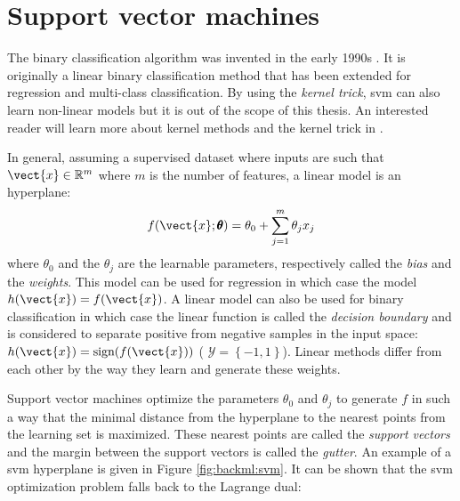 
\section{Support vector machines}
\label{sec:backml:svm}

The  binary classification algorithm was invented in the early 1990s \cite{boser1992training}.
It is originally a linear binary classification method that has been extended for regression and multi-class classification.
By using the \textit{kernel trick}, \acrshort{svm} can also learn non-linear models
but it is out of the scope of this thesis. An interested reader will learn more
about kernel methods and the kernel trick in \cite{hastie2017elements}.

In general, assuming a supervised dataset where inputs are such that
$\vect{x} \in \mathbb{R}^m$ where $m$ is the number of features, a linear model
is an hyperplane:
\begin{equation}
\label{eqn:backml:linearmodel}
f(\vect{x};\pmb{\theta}) = \theta_0 + \sum_{j=1}^m \theta_j x_j
\end{equation}
where $\theta_0$ and the $\theta_j$ are the learnable parameters, respectively
called the \textit{bias} and the \textit{weights}. This model can be used for
regression in which case the model $h(\vect{x}) = f(\vect{x})$. A linear model
can also be used for binary classification in which case the linear function is
called the \textit{decision boundary} and is considered to separate positive from
negative samples in the input space: $h(\vect{x}) = \text{sign}(f(\vect{x}))$ (\ie
$\mathcal{Y} = \left\{-1, 1\right\}$). Linear methods differ from each other by
the way they learn and generate these weights.

Support vector machines optimize the parameters $\theta_0$ and $\theta_j$ to
generate $f$ in such a way that the minimal distance from the hyperplane to the
nearest points from the learning set is maximized. These nearest points are called
the \textit{support vectors} and the margin between the support vectors is called
the \textit{gutter}. An example of a \acrshort{svm} hyperplane is given in Figure
\ref{fig:backml:svm}. It can be shown that the \acrshort{svm} optimization problem
falls back to the Lagrange dual:

